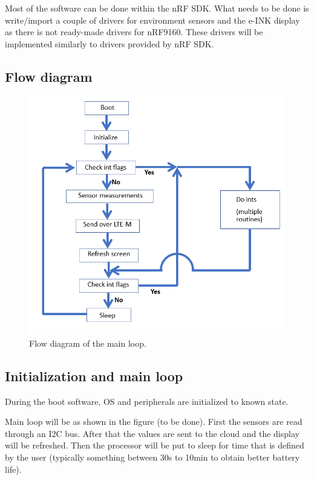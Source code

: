 \documentclass[]{dithesis}
\begin{document}
Most of the software can be done within the nRF SDK. What needs to be done is write/import a couple of drivers for environment sensors and the e-INK display as there is not ready-made drivers for nRF9160. These drivers will be implemented similarly to drivers provided by nRF SDK. 

\subsection{Flow diagram}

\begin{figure}[hbt!]
    \centering
    \includegraphics[width=12cm]{flowdiagram_sulari.png}
    \caption{Flow diagram of the main loop.}
    \label{fig:my_label}
\end{figure}


\subsection{Initialization and main loop}

During the boot software, OS and peripherals are initialized to known state.  

Main loop will be as shown in the figure (to be done). First the sensors are read through an I2C bus. After that the values are sent to the cloud and the display will be refreshed. Then the processor will be put to sleep for time that is defined by the user (typically something between 30s to 10min to obtain better battery life). 
\end{document}
